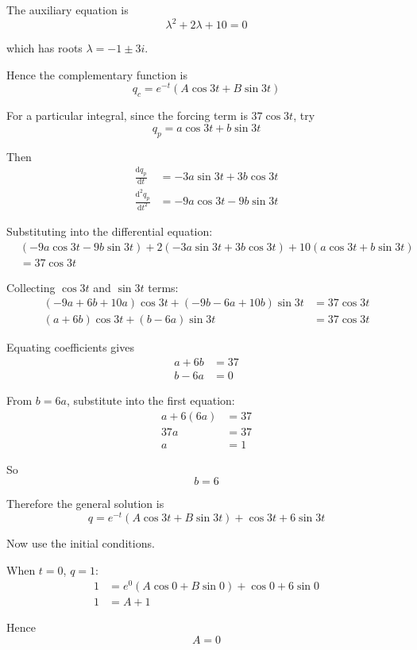 \documentclass[leqno]{article}
\begin{document}
\begin{enumerate}[
  label=\textbf{\arabic*.},
  leftmargin=*,
  topsep=0pt,
  partopsep=0pt,
  parsep=0pt
]
\begin{djsSolution}
\begin{enumerate}[label=\textbf{(\alph*)}]
  The auxiliary equation is
  \[
  \lambda^2+2\lambda+10=0
  \]

  which has roots \(\lambda=-1\pm 3i\).

  Hence the complementary function is
  \[
  q_c=e^{-t}(A\cos 3t+B\sin 3t)
  \]

  For a particular integral, since the forcing term is \(37\cos 3t\), try
  \[
  q_p=a\cos 3t+b\sin 3t
  \]

  Then
  \begin{align*}
  \frac{\mathrm{d}q_p}{\mathrm{d}t}&=-3a\sin 3t+3b\cos 3t \\
  \frac{\mathrm{d}^2q_p}{\mathrm{d}t^2}&=-9a\cos 3t-9b\sin 3t
  \end{align*}

  Substituting into the differential equation:
  \begin{align*}
  &(-9a\cos 3t-9b\sin 3t)+2(-3a\sin 3t+3b\cos 3t)+10(a\cos 3t+b\sin 3t) \\
  &=37\cos 3t
  \end{align*}

  Collecting \(\cos 3t\) and \(\sin 3t\) terms:
  \begin{align*}
  (-9a+6b+10a)\cos 3t+(-9b-6a+10b)\sin 3t&=37\cos 3t \\
  (a+6b)\cos 3t+(b-6a)\sin 3t&=37\cos 3t
  \end{align*}

  Equating coefficients gives
  \begin{align*}
  a+6b&=37 \\
  b-6a&=0
  \end{align*}

  From \(b=6a\), substitute into the first equation:
  \begin{align*}
  a+6(6a)&=37 \\
  37a&=37 \\
  a&=1
  \end{align*}

  So
  \[
  b=6
  \]

  Therefore the general solution is
  \[
  q=e^{-t}(A\cos 3t+B\sin 3t)+\cos 3t+6\sin 3t
  \]

  Now use the initial conditions.

  When \(t=0\), \(q=1\):
  \begin{align*}
  1&=e^{0}(A\cos 0+B\sin 0)+\cos 0+6\sin 0 \\
  1&=A+1
  \end{align*}

  Hence
  \[
  A=0
  \]


\end{enumerate}
\end{djsSolution}
\end{enumerate}
\end{document}
